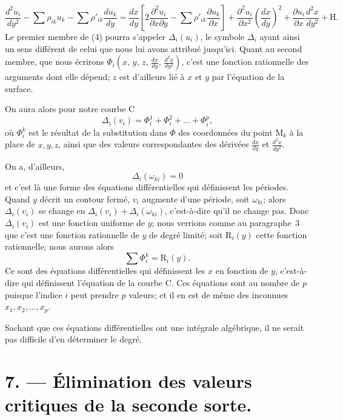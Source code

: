 \documentclass{article}
\begin{document}
\[
\frac{d^{2}u_{i}}{dy^{2}} - \sum \rho_{ik} u_{k} - \sum \rho'_{ik}\frac{du_{k}}{dy} = \frac{dx}{dy}\left[ 2 \frac{\partial^{2}u_{i}}{\partial x \partial y} - \sum \rho'_{ik}\frac{\partial u_{k}}{\partial x} \right] + \frac{\partial^{2}u_{i}}{\partial x^{2}}\left(\frac{dx}{dy}\right)^{2} + \frac{\partial u_{i}}{\partial x}\frac{d^{2}x}{dy^{2}} + \mathrm{H}. \tag{4}
\]
Le premier membre de (4) pourra s'appeler $\Delta_{i}(u_{i})$, le symbole $\Delta_{i}$ ayant ainsi un sens différent de celui que nous lui avons attribué jusqu'ici. Quant au second membre, que nous écrirons $\Phi_{i}\left(x,\, y,\, z,\, \frac{dx}{dy},\, \frac{d^{2}x}{dy^{2}}\right)$, c'est une fonction rationnelle des arguments dont elle dépend; $z$ est d'ailleurs lié à $x$ et $y$ par l'équation de la surface.

On aura alors pour notre courbe $\mathrm{C}$
\[
\Delta_{i}(v_{i}) = \Phi_{i}^{1} + \Phi_{i}^{2} + \ldots + \Phi_{i}^{p},
\]
où $\Phi_{i}^{k}$ est le résultat de la substitution dans $\Phi$ des coordonnées du point $\mathrm{M}_{k}$
à la place de $x, y, z$, ainsi que des valeurs correspondantes des dérivées $\frac{dx}{dy}$ et $\frac{d^{2}x}{dy^{2}}$.

On a, d'ailleurs,
\[
\Delta_{i}(\omega_{ki}) = 0
\]
et c'est là une forme des équations différentielles qui définissent les périodes. Quand $y$ décrit un contour fermé, $v_{i}$ augmente d'une période, soit $\omega_{ki}$; alors $\Delta_{i}(v_{i})$ se change en $\Delta_{i}(v_{i}) + \Delta_{i}(\omega_{ki})$, c'est-à-dire qu'il ne change pas. Donc $\Delta_{i}(v_{i})$ est une fonction uniforme de $y$; nous verrions comme au paragraphe~3 que c'est une fonction rationnelle de $y$ de degré limité; soit $\mathrm{R}_{i}(y)$ cette fonction rationnelle; nous aurons alors
\[
\sum \Phi_{i}^{k} = \mathrm{R}_{i}(y). \tag{5}
\]
Ce sont des équations différentielles qui définissent les $x$ en fonction de $y$, c'est-à-dire qui définissent l'équation de la courbe $\mathrm{C}$. Ces équations sont au nombre de $p$ puisque l'indice $i$ peut prendre $p$ valeurs; et il en est de même des inconnues $x_{1}, x_{2}, \ldots, x_{p}$.

Sachant que ces équations différentielles ont une intégrale algébrique, il ne serait pas difficile d'en déterminer le degré.

\section*{7. --- Élimination des valeurs critiques de la seconde sorte.}
\end{document}

